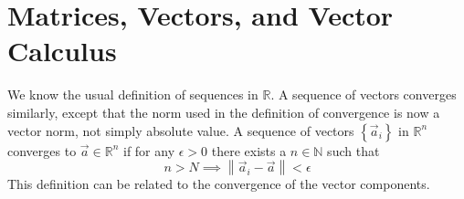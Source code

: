 




\tableofcontents



\chapter{Matrices, Vectors, and Vector Calculus}

We know the usual definition of sequences in $\mathbb{R}$. A sequence of vectors converges similarly, except that the norm used in the definition of convergence is now a vector norm, not simply absolute value. A sequence of vectors $\left\{ \vec{a}_i\right\}$ in $\mathbb{R}^n$ converges to $\vec{a}\in \mathbb{R}^n$ if for any $\epsilon >0 $ there exists a $n\in \mathbb{N}$ such that \[ n>N \implies \left\lVert \vec{a}_i - \vec{a}\right\rVert < \epsilon \] This definition can be related to the convergence of the vector components.

